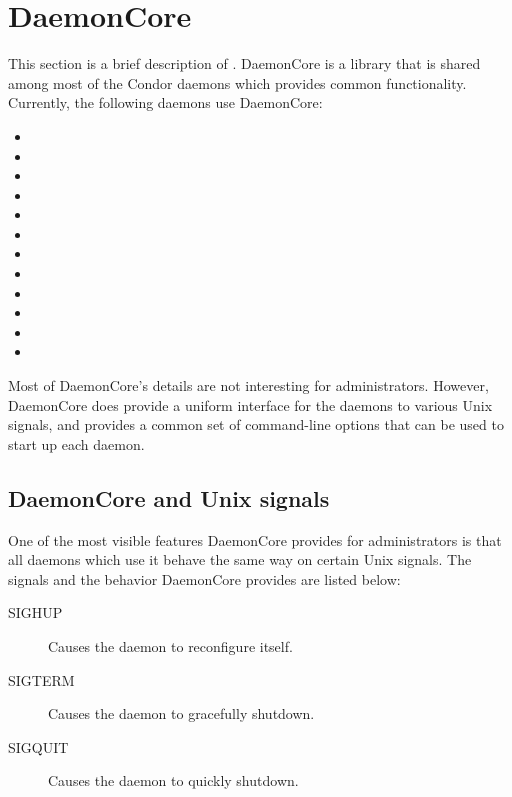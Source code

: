 
\section{\label{sec:DaemonCore}DaemonCore}

This section is a brief description of .  DaemonCore
is a library that is shared among most of the Condor daemons which
provides common functionality.  Currently, the following daemons use
DaemonCore:

\begin{itemize}
\item {}
\item {}
\item {}
\item {}
\item {}
\item {}
\item {}
\item {}
\item {}
\item {}
\item {}
\item {}
\end{itemize}

Most of DaemonCore's details are not interesting for administrators.
However, DaemonCore does provide a uniform interface for the daemons
to various Unix signals, and provides a common set of command-line
options that can be used to start up each daemon.

\subsection{\label{sec:DaemonCore-Signals}DaemonCore and Unix signals}

One of the most visible features DaemonCore provides for
administrators is that all daemons which use it behave the same way on
certain Unix signals.  The signals and the behavior DaemonCore
provides are listed below:

\begin{description}
\item[SIGHUP] Causes the daemon to reconfigure itself.
\item[SIGTERM] Causes the daemon to gracefully shutdown.
\item[SIGQUIT] Causes the daemon to quickly shutdown.
\end{description}


